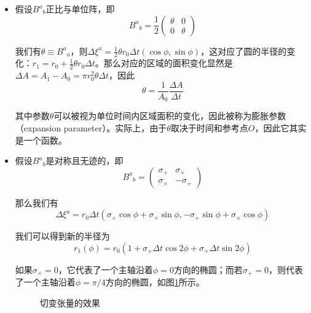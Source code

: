 \documentclass[hyperref, UTF8, a4paper]{ctexart}
\begin{document}
\begin{itemize}
\item 假设$B^{a}{}_{b}$正比与单位阵，即
\begin{equation*}
	B^{a}{}_{b} =\frac{1}{2}\begin{pmatrix}
		\theta  & 0\\
		0 & \theta 
	\end{pmatrix}
\end{equation*}

我们有$\theta \equiv B^{a}{}_{a}$，则$\Delta \xi ^{a} =\frac{1}{2} \theta r_{0} \Delta t(\cos \phi ,\sin \phi )$，这对应了圆的半径的变化：$r_{1} =r_{0} +\frac{1}{2} \theta r_{0} \Delta t$。那么对应的区域的面积变化显然是$\Delta A=A_{1} -A_{0} =\pi r_{0}^{2} \theta \Delta t$，因此
\begin{equation*}
	\theta =\frac{1}{A_{0}}\frac{\Delta A}{\Delta t}
\end{equation*}

其中参数$\theta $可以被视为单位时间内区域面积的变化，因此被称为膨胀参数（expansion parameter）。实际上，由于$\theta $取决于时间和参考点$O$，因此它其实是一个函数。
\item 假设$B^{a}{}_{b}$是对称且无迹的，即
\begin{equation*}
	B^{a}{}_{b} =\begin{pmatrix}
		\sigma _{+} & \sigma _{\times }\\
		\sigma _{\times } & -\sigma _{+}
	\end{pmatrix}
\end{equation*}

那么我们有
\begin{equation*}
	\Delta \xi ^{a} =r_{0} \Delta t( \sigma _{+}\cos \phi +\sigma _{\times }\sin \phi ,-\sigma _{+}\sin \phi +\sigma _{\times }\cos \phi )
\end{equation*}

我们可以得到新的半径为
\begin{equation*}
	r_{1}( \phi ) =r_{0}( 1+\sigma _{+} \Delta t\cos 2\phi +\sigma _{\times } \Delta t\sin 2\phi )
\end{equation*}

如果$\sigma _{\times } =0$，它代表了一个主轴沿着$\phi =0$方向的椭圆；而若$\sigma _{+} =0$，则代表了一个主轴沿着$\phi =\pi /4$方向的椭圆，如图\ref{shear effect}所示。

\begin{figure}
	\centering
	
	\caption{切变张量的效果}
	\label{shear effect}
\end{figure}


\end{itemize}
\end{document}

